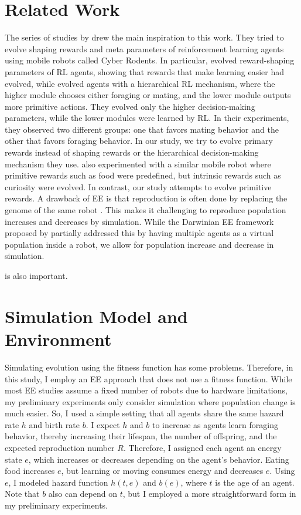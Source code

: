 \section{Related Work}
The series of studies by \citet{elfwingBiologicallyInspiredEmbodied2005,elfwingDarwinianEmbodiedEvolution2011a,elfwingEmergencePolymorphicMating2014} drew the main inspiration to this work.
They tried to evolve shaping rewards and meta parameters of reinforcement learning agents using mobile robots called Cyber Rodents. In particular, \citet{elfwingDarwinianEmbodiedEvolution2011a} evolved reward-shaping parameters of RL agents, showing that rewards that make learning easier had evolved, while \citet{elfwingEmergencePolymorphicMating2014} evolved agents with a hierarchical RL mechanism, where the higher module chooses either foraging or mating, and the lower module outputs more primitive actions. They evolved only the higher decision-making parameters, while the lower modules were learned by RL. In their experiments, they observed two different groups: one that favors mating behavior and the other that favors foraging behavior. In our study, we try to evolve primary rewards instead of shaping rewards or the hierarchical decision-making mechanism they use. \citet{uchibeFindingIntrinsicRewards2008} also experimented with a similar mobile robot where primitive rewards such as food were predefined, but intrinsic rewards such as curiosity were evolved. In contrast, our study attempts to evolve primitive rewards. A drawback of EE is that reproduction is often done by replacing the genome of the same robot \citep{bredecheEmbodiedEvolutionCollective2018}. This makes it challenging to reproduce population increases and decreases by simulation. While the Darwinian EE framework proposed by \citet{elfwingDarwinianEmbodiedEvolution2011a} partially addressed this by having multiple agents as a virtual population inside a robot, we allow for population increase and decrease in simulation.

\citet{singhWhereRewardsCome} is also important.

\section{Simulation Model and Environment}
Simulating evolution using the fitness function has some problems. Therefore, in this study, I employ an EE approach that does not use a fitness function. While most EE studies assume a fixed number of robots due to hardware limitations, my preliminary experiments only consider simulation where population change is much easier. So, I used a simple setting that all agents share the same hazard rate $h$ and birth rate $b$. I expect $h$ and $b$ to increase as agents learn foraging behavior, thereby increasing their lifespan, the number of offspring, and the expected reproduction number $R$. Therefore, I assigned each agent an energy state $e$, which increases or decreases depending on the agent's behavior. Eating food increases $e$, but learning or moving consumes energy and decreases $e$. Using $e$, I modeled hazard function $h (t,e)$ and $b (e)$, where $t$ is the age of an agent. Note that $b$ also can depend on $t$, but I employed a more straightforward form in my preliminary experiments.

